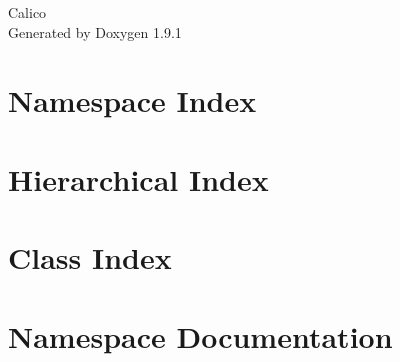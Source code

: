 \let\mypdfximage\pdfximage\def\pdfximage{\immediate\mypdfximage}\documentclass[twoside]{book}
\newcommand{\+}{\discretionary{\mbox{\scriptsize$\hookleftarrow$}}{}{}}
\newcommand{\clearemptydoublepage}{%
  \newpage{\pagestyle{empty}\cleardoublepage}%
}
\begin{document}
\raggedbottom

\hypersetup{pageanchor=false,
             bookmarksnumbered=true,
             pdfencoding=unicode
            }
\begin{titlepage}
\vspace*{7cm}
\begin{center}%
{\Large Calico }\\
\vspace*{1cm}
{\large Generated by Doxygen 1.9.1}\\
\end{center}
\end{titlepage}
\clearemptydoublepage
{}
\tableofcontents
\clearemptydoublepage
{}
\hypersetup{pageanchor=true}

\chapter{Namespace Index}

\chapter{Hierarchical Index}

\chapter{Class Index}

\chapter{Namespace Documentation}




\end{document}

